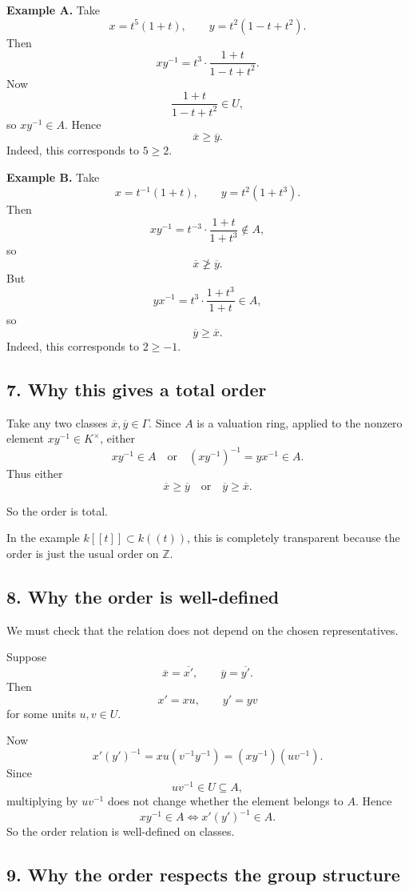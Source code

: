 \documentclass[12pt,a4paper]{article}
\theoremstyle{notespace}
\begin{document}
\textbf{Example A.}
Take
\[
x=t^5(1+t),
\qquad
y=t^2(1-t+t^2).
\]
Then
\[
xy^{-1}
=
t^3\cdot \frac{1+t}{1-t+t^2}.
\]
Now
\[
\frac{1+t}{1-t+t^2}\in U,
\]
so \(xy^{-1}\in A\). Hence
\[
\overline x \ge \overline y.
\]
Indeed, this corresponds to \(5\ge 2\).

\textbf{Example B.}
Take
\[
x=t^{-1}(1+t),
\qquad
y=t^2(1+t^3).
\]
Then
\[
xy^{-1}
=
t^{-3}\cdot \frac{1+t}{1+t^3}\notin A,
\]
so
\[
\overline x \not\ge \overline y.
\]
But
\[
yx^{-1}
=
t^3\cdot \frac{1+t^3}{1+t}\in A,
\]
so
\[
\overline y \ge \overline x.
\]
Indeed, this corresponds to \(2\ge -1\).

\subsection{7. Why this gives a total order}

Take any two classes \(\overline x,\overline y\in \Gamma\). Since \(A\) is a valuation ring, applied to the nonzero element \(xy^{-1}\in K^\times\), either
\[
xy^{-1}\in A
\quad \text{or} \quad
(xy^{-1})^{-1}=yx^{-1}\in A.
\]
Thus either
\[
\overline x \ge \overline y
\quad \text{or} \quad
\overline y \ge \overline x.
\]

So the order is total.

In the example \(k[[t]]\subset k((t))\), this is completely transparent because the order is just the usual order on \(\mathbb Z\).

\subsection{8. Why the order is well-defined}

We must check that the relation does not depend on the chosen representatives.

Suppose
\[
\overline x=\overline{x'},
\qquad
\overline y=\overline{y'}.
\]
Then
\[
x'=xu,
\qquad
y'=yv
\]
for some units \(u,v\in U\).

Now
\[
x'(y')^{-1}
=
xu(v^{-1}y^{-1})
=
(xy^{-1})(uv^{-1}).
\]
Since
\[
uv^{-1}\in U\subseteq A,
\]
multiplying by \(uv^{-1}\) does not change whether the element belongs to \(A\). Hence
\[
xy^{-1}\in A
\iff
x'(y')^{-1}\in A.
\]
So the order relation is well-defined on classes.

\subsection{9. Why the order respects the group structure}
\end{document}
